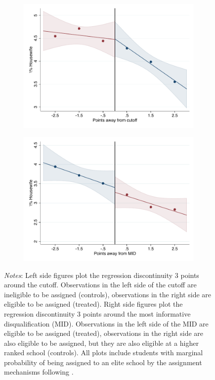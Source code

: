 \documentclass[oneside,11pt]{article}
\begin{document}
\begin{figure}[H]
\begin{center}
    \begin{subfigure}{0.475\textwidth}
        \centering
        \includegraphics[width=\textwidth]{04_Figures/rd_plot_tau_Housewife_IPN3.pdf}
    \end{subfigure}
    \begin{subfigure}{0.475\textwidth}
        \centering
        \includegraphics[width=\textwidth]{04_Figures/rd_plot_mid_Housewife_IPN3.pdf}
    \end{subfigure}
    \end{center}
    
\footnotesize
\textit{Notes}: Left side figures plot the regression discontinuity 3 points around the cutoff. Observations in the left side of the cutoff are ineligible to be assigned (controls), observations in the right side are eligible to be assigned (treated). Right side figures plot the regression discontinuity 3 points around the most informative disqualification (MID). Observations in the left side of the MID are eligible to be assigned (treated), observations in the right side are also eligible to be assigned, but they are also eligible at a higher ranked school (controls). All plots include students with marginal probability of being assigned to an elite school by the assignment mechanisms following \citet{abdulkadirouglu2022breaking}. 
\end{figure}
\end{document}
